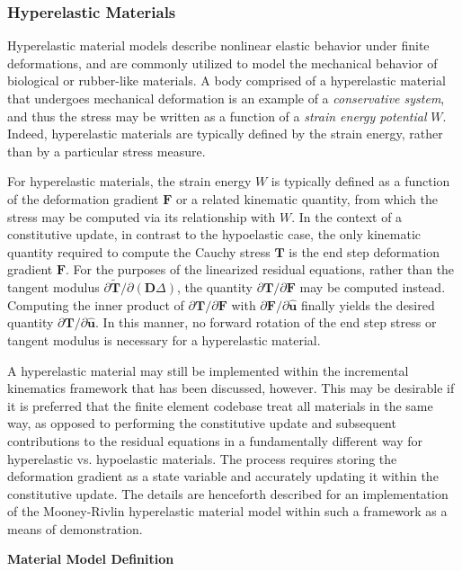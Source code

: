\subsubsection{Hyperelastic Materials}

Hyperelastic material models describe nonlinear elastic behavior under finite deformations, and are commonly utilized to model the mechanical behavior of biological or rubber-like materials. A body comprised of a hyperelastic material that undergoes mechanical deformation is an example of a  \textit{conservative system}, and thus the stress may be written as a function of a \textit{strain energy potential} $W$. Indeed, hyperelastic materials are typically defined by the strain energy, rather than by a particular stress measure.

For hyperelastic materials, the strain energy $W$ is typically defined as a function of the deformation gradient $\bm{F}$ or a related kinematic quantity, from which the stress may be computed via its relationship with $W$. In the context of a constitutive update, in contrast to the hypoelastic case, the only kinematic quantity required to compute the Cauchy stress $\bm{T}$ is the end step deformation gradient $\bm{F}$. For the purposes of the linearized residual equations, rather than the tangent modulus ${\partial \tilde{\bm{T}}}/{\partial (\bm{D}\Delta)}$, the quantity ${\partial \bm{T}}/{\partial \bm{F}}$ may be computed instead. Computing the inner product of ${\partial \bm{T}}/{\partial \bm{F}}$ with $\partial \bm{F}/\partial \hat{\bm{u}}$ finally yields the desired quantity $\partial \bm{T}/\partial \hat{\bm{u}}$. In this manner, no forward rotation of the end step stress or tangent modulus is necessary for a hyperelastic material.

A hyperelastic material may still be implemented within the incremental kinematics framework that has been discussed, however. This may be desirable if it is preferred that the finite element codebase treat all materials in the same way, as opposed to performing the constitutive update and subsequent contributions to the residual equations in a fundamentally different way for hyperelastic vs. hypoelastic materials. The process requires storing the deformation gradient as a state variable and accurately updating it within the constitutive update. The details are henceforth described for an implementation of the Mooney-Rivlin hyperelastic material model within such a framework as a means of demonstration.

\textbf{Material Model Definition}

